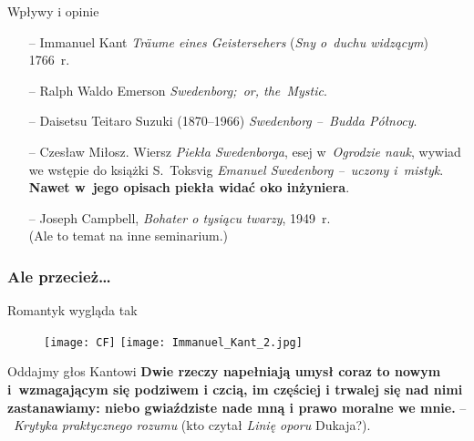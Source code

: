 \documentclass{beamer}  %
\begin{document}
\begin{frame}

  \begin{block}{Wpływy i opinie}
    \begin{itemize}
    \item[--] Immanuel Kant \emph{Tr\"{a}ume eines Geistersehers}
      (\emph{Sny o~duchu widzącym}) 1766~r.
    \item[--] Ralph Waldo Emerson \emph{Swedenborg;~or, the~Mystic}.
    \item[--] Daisetsu Teitaro Suzuki (1870--1966) \emph{Swedenborg
        --~Budda Północy}.
    \item[--] Czesław Miłosz. Wiersz \emph{Piekła Swedenborga}, esej
      w~\emph{Ogrodzie nauk}, wywiad we wstępie do książki S.~Toksvig
      \emph{Emanuel Swedenborg --~uczony i~mistyk}. \textbf{Nawet
        w~jego opisach piekła widać oko inżyniera}.
    \item[--] Joseph Campbell, \emph{Bohater o tysiącu twarzy},
      1949~r. \\ (Ale to temat na inne seminarium.)
    \end{itemize}
  \end{block}

\end{frame}



\begin{frame}
  \frametitle{Ale przecież\ldots}
  \begin{block}{Romantyk wygląda tak}
    \begin{figure}
      \centering

      \texttt{[image: CF]} \pause
      \texttt{[image: Immanuel\_Kant\_2.jpg]}
    \end{figure}
  \end{block}
  \pause

  \begin{block}{Oddajmy głos Kantowi}
    \textbf{Dwie rzeczy napełniają umysł coraz to nowym i~wzmagającym
      się podziwem i czcią, im częściej i trwalej się nad nimi
      zastanawiamy: niebo gwiaździste nade mną i prawo moralne we
      mnie.} --~\emph{Krytyka praktycznego rozumu} (kto czytał
    \emph{Linię oporu} Dukaja?).
  \end{block}

\end{frame}
\end{document}
